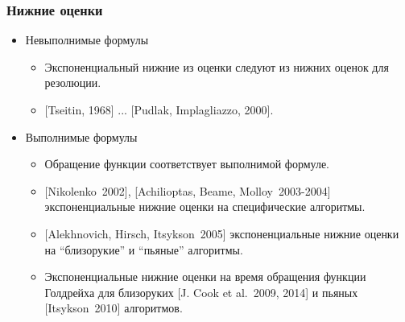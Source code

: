 \begin{frame}
    \frametitle{Нижние оценки}

    \pause
	\begin{itemize}
		\item Невыполнимые формулы
		\begin{itemize}
            \item{} Экспоненциальный нижние из оценки следуют из нижних оценок для резолюции.
			\item{} [Tseitin, 1968] ... [Pudlak, Implagliazzo, 2000].
		\end{itemize}
        \pause
		\item Выполнимые формулы
		\begin{itemize}
			\item Обращение функции соответствует выполнимой формуле.
            \pause
            \item{} [Nikolenko~2002], [Achilioptas, Beame, Molloy~2003-2004] экспоненциальные нижние оценки на специфические алгоритмы.
            \item{} [Alekhnovich, Hirsch, Itsykson~2005] экспоненциальные нижние оценки на ``близорукие'' и ``пьяные'' алгоритмы.
            \pause
            \item{}  Экспоненциальные нижние оценки на время обращения функции Голдрейха для близоруких [J. Cook et al.~2009,
				2014] и пьяных [Itsykson~2010] алгоритмов.
		\end{itemize}
	\end{itemize}
\end{frame}

